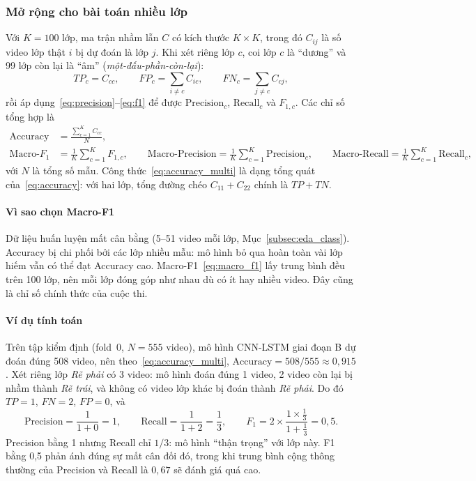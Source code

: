 \subsubsection{Mở rộng cho bài toán nhiều lớp}
\label{subsubsec:multiclass_metrics}

Với $K=100$ lớp, ma trận nhầm lẫn $C$ có kích thước $K\times K$, trong đó $C_{ij}$ là số video lớp thật $i$ bị dự đoán là lớp $j$. Khi xét riêng lớp $c$, coi lớp $c$ là ``dương'' và 99 lớp còn lại là ``âm'' (\textit{một-đấu-phần-còn-lại}):
\begin{equation}
  TP_c = C_{cc}, \qquad FP_c = \sum_{i\ne c} C_{ic}, \qquad FN_c = \sum_{j\ne c} C_{cj},
\end{equation}
rồi áp dụng~\eqref{eq:precision}--\eqref{eq:f1} để được $\text{Precision}_c$, $\text{Recall}_c$ và $F_{1,c}$. Các chỉ số tổng hợp là
\begin{align}
  \text{Accuracy} &= \frac{\sum_{c=1}^{K} C_{cc}}{N}, \label{eq:accuracy_multi}\\
  \text{Macro-}F_1 &= \frac{1}{K}\sum_{c=1}^{K}F_{1,c}, \qquad
  \text{Macro-Precision} = \frac{1}{K}\sum_{c=1}^{K}\text{Precision}_c, \qquad
  \text{Macro-Recall} = \frac{1}{K}\sum_{c=1}^{K}\text{Recall}_c, \label{eq:macro_f1}
\end{align}
với $N$ là tổng số mẫu. Công thức~\eqref{eq:accuracy_multi} là dạng tổng quát của~\eqref{eq:accuracy}: với hai lớp, tổng đường chéo $C_{11}+C_{22}$ chính là $TP+TN$.

\paragraph*{Vì sao chọn Macro-F1} Dữ liệu huấn luyện mất cân bằng (5--51 video mỗi lớp, Mục~\ref{subsec:eda_class}). Accuracy bị chi phối bởi các lớp nhiều mẫu: mô hình bỏ qua hoàn toàn vài lớp hiếm vẫn có thể đạt Accuracy cao. Macro-F1~\eqref{eq:macro_f1} lấy trung bình đều trên 100 lớp, nên mỗi lớp đóng góp như nhau dù có ít hay nhiều video. Đây cũng là chỉ số chính thức của cuộc thi.

\paragraph*{Ví dụ tính toán} Trên tập kiểm định (fold~0, $N=555$ video), mô hình CNN-LSTM giai đoạn B dự đoán đúng 508 video, nên theo~\eqref{eq:accuracy_multi}, $\text{Accuracy}=508/555\approx0{,}915$. Xét riêng lớp \textit{Rẽ phải} có 3 video: mô hình đoán đúng 1 video, 2 video còn lại bị nhầm thành \textit{Rẽ trái}, và không có video lớp khác bị đoán thành \textit{Rẽ phải}. Do đó $TP=1$, $FN=2$, $FP=0$, và
\[
  \text{Precision}=\frac{1}{1+0}=1, \qquad
  \text{Recall}=\frac{1}{1+2}=\frac{1}{3}, \qquad
  F_1 = 2\times\frac{1\times\frac{1}{3}}{1+\frac{1}{3}} = 0{,}5.
\]
Precision bằng 1 nhưng Recall chỉ $1/3$: mô hình ``thận trọng'' với lớp này. F1 bằng 0,5 phản ánh đúng sự mất cân đối đó, trong khi trung bình cộng thông thường của Precision và Recall là $0{,}67$ sẽ đánh giá quá cao.

